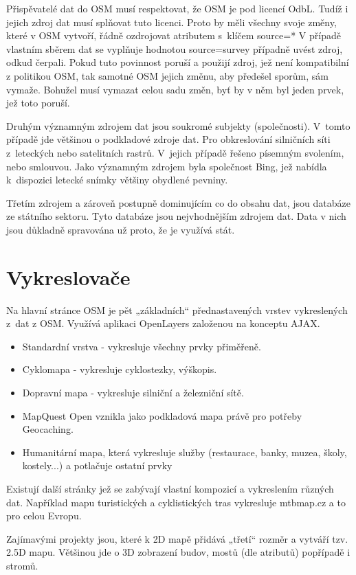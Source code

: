 Přispěvatelé dat do OSM musí respektovat, že OSM je pod licencí OdbL. 
Tudíž i jejich zdroj dat musí splňovat tuto licenci. Proto by měli 
všechny svoje změny, které v OSM vytvoří, řádně ozdrojovat atributem 
s~klíčem 
source=*
V případě vlastním sběrem dat se vyplňuje hodnotou 
source=survey
případně uvést zdroj, odkud čerpali. Pokud tuto povinnost poruší a 
použijí zdroj, jež není kompatibilní z politikou OSM, tak samotné OSM 
jejich změnu, aby předešel sporům, sám vymaže. Bohužel musí vymazat 
celou sadu změn, byť by v něm byl jeden prvek, jež toto poruší. 

Druhým významným zdrojem dat jsou soukromé subjekty (společnosti). 
V~tomto případě jde většinou o podkladové zdroje dat. Pro obkreslování 
silničních síti z~leteckých nebo satelitních rastrů. V~jejich případě 
řešeno písemným svolením, nebo smlouvou. Jako významným zdrojem byla 
společnost Bing, jež nabídla k~dispozici letecké snímky většiny 
obydlené pevniny. 

Třetím zdrojem a zároveň postupně dominujícím co do obsahu dat, jsou 
databáze ze státního sektoru. Tyto databáze jsou nejvhodnějším zdrojem 
dat. Data v nich jsou důkladně spravována už proto, že je využívá stát. 

\section{Vykreslovače}
\label{vykreslovače}
Na hlavní stránce OSM je pět „základních“ přednastavených vrstev vykreslených 
z~dat z OSM. Využívá aplikaci OpenLayers založenou na konceptu AJAX.

\begin{itemize}

  \item Standardní vrstva - vykresluje všechny prvky přiměřeně.
  \item Cyklomapa - vykresluje cyklostezky, výškopis. 
  \item Dopravní mapa - vykresluje silniční a železniční sítě.
  \item MapQuest Open vznikla jako podkladová mapa právě pro potřeby 
Geocaching.
  \item Humanitární mapa, která vykresluje služby (restaurace, banky, muzea, 
  školy, kostely...)  a potlačuje ostatní prvky 

\end{itemize}

Existují další stránky jež se zabývají vlastní kompozicí a vykreslením
různých dat. Například mapu turistických a cyklistických tras vykresluje
 mtbmap.cz a to pro celou Evropu. 
 
Zajímavými projekty jsou, které k 2D mapě přidává „třetí“ rozměr a 
vytváří tzv. 2.5D mapu. Většinou jde o 3D zobrazení budov, mostů (dle 
atributů) popřípadě i stromů. 

